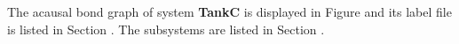 

   The acausal bond graph of system \textbf{TankC} is
   displayed in Figure  and its label
   file is listed in Section .
   The subsystems are listed in Section .
